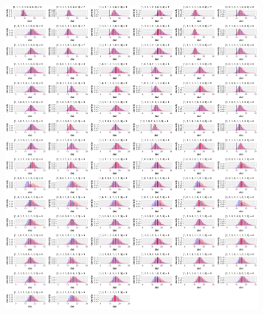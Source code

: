 \begin{figure}
  \centering
  \includegraphics[width=\textwidth]{figures/ch-6/test.png}
  \caption{}
  \label{fig:beltwear-resampling}
\end{figure}

